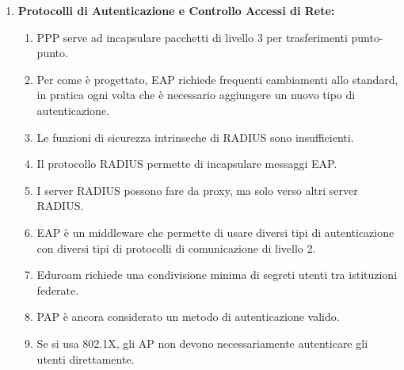 \documentclass[11pt,a4paper]{article}
\begin{document}
\begin{questionbox}
\begin{enumerate}[label=\textbf{1.\arabic*}]
    \item \textbf{Protocolli di Autenticazione e Controllo Accessi di Rete:}
    \begin{enumerate}[label=\alph*.]
        \item PPP serve ad incapsulare pacchetti di livello 3 per trasferimenti punto-punto.
        \item Per come \`e progettato, EAP richiede frequenti cambiamenti allo standard, in pratica ogni volta che \`e necessario aggiungere un nuovo tipo di autenticazione.
        \item Le funzioni di sicurezza intrinseche di RADIUS sono insufficienti.
        \item Il protocollo RADIUS permette di incapsulare messaggi EAP.
        \item I server RADIUS possono fare da proxy, ma solo verso altri server RADIUS.
        \item EAP \`e un middleware che permette di usare diversi tipi di autenticazione con diversi tipi di protocolli di comunicazione di livello 2.
        \item Eduroam richiede una condivisione minima di segreti utenti tra istituzioni federate.
        \item PAP \`e ancora considerato un metodo di autenticazione valido.
        \item Se si usa 802.1X, gli AP non devono necessariamente autenticare gli utenti direttamente.
    \end{enumerate}


\end{enumerate}
\end{questionbox}
\end{document}
